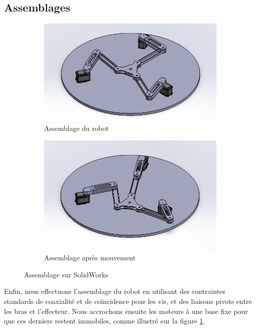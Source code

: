 \documentclass[a4paper, 11pt]{report}
\begin{document}
\subsection{Assemblages}


\begin{figure}[!tbh]
    \centering
    \begin{subfigure}[t]{0.48\textwidth}
        \centering
        \includegraphics[width=\textwidth]{Figures/assemblage_1.png}
        \caption{Assemblage du robot}
    \end{subfigure}
    \hfill
    \begin{subfigure}[t]{0.48\textwidth}
        \centering
        \includegraphics[width=\textwidth]{Figures/assemblage_2.png}
        \caption{Assemblage après mouvement}
    \end{subfigure}
    \caption{Assemblage sur SolidWorks}
    \label{fig:assemblage}
\end{figure}

Enfin, nous effectuons l'assemblage du robot en utilisant des contraintes standards de coaxialité et de coïncidence pour les vis, et des liaisons pivots entre les bras et l'effecteur. Nous accrochons ensuite les moteurs à une base fixe pour que ces derniers restent immobiles, comme illustré sur la figure \ref{fig:assemblage}.
\end{document}
